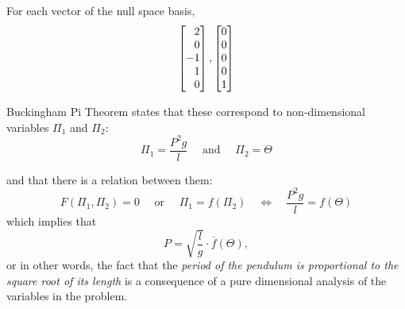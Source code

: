 \documentclass{workbook}
\begin{document}
\begin{slide}

For each vector of the null space basis, 
\[ \mat{2\\0\\-1\\1\\0} , \mat{0\\0\\0\\0\\1} \]

Buckingham Pi Theorem states that these correspond to non-dimensional variables $\Pi_1$ and $\Pi_2$:
\[ \Pi_1 = \frac{P^2 g}{l} \quad \text{ and } \quad \Pi_2 = \Theta \]

and that there is a relation between them:
\[
F(\Pi_1,\Pi_2)=0 \quad \text{ or } \quad \Pi_1 = f(\Pi_2) \quad \Leftrightarrow \quad \frac{P^2 g}{l} = f(\Theta)
\]
which implies that
\[ 
P = \sqrt{\frac{l}{g}} \cdot \overline{f}(\Theta),
\]
or in other words, the fact that the \textit{period of the pendulum is proportional to the square root of its length} is a consequence of a pure dimensional analysis of the variables in the problem.

\end{slide}
\end{document}
